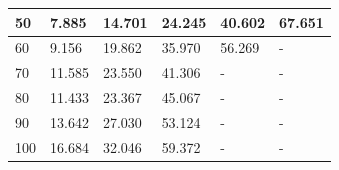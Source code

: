 \begin{table}[htp]
\begin{tabular}{|l|l|l|l|l|l|}
50                               & 7.885           & 14.701           & 24.245           & 40.602           & 67.651           \\ \hline
60                               & 9.156           & 19.862           & 35.970           & 56.269           & -                \\ \hline
70                               & 11.585          & 23.550           & 41.306           & -                & -                \\ \hline
80                               & 11.433          & 23.367           & 45.067           & -                & -                \\ \hline
90                               & 13.642          & 27.030           & 53.124           & -                & -                \\ \hline
100                              & 16.684          & 32.046           & 59.372           & -                & -                \\ \hline
\end{tabular}
\end{table}


